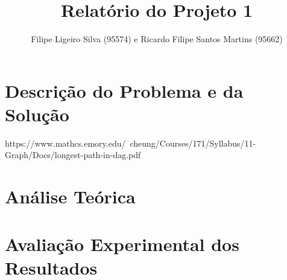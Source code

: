 \documentclass[a4paper, 12pt]{article}
\author{Filipe Ligeiro Silva (95574) e Ricardo Filipe Santos Martins (95662)}
\title{Relatório do Projeto 1}
\date{}
\begin{document}
\section*{Descrição do Problema e da Solução}
https://www.mathcs.emory.edu/~cheung/Courses/171/Syllabus/11-Graph/Docs/longest-path-in-dag.pdf
\section*{Análise Teórica}
\section*{Avaliação Experimental dos Resultados}
\end{document}
